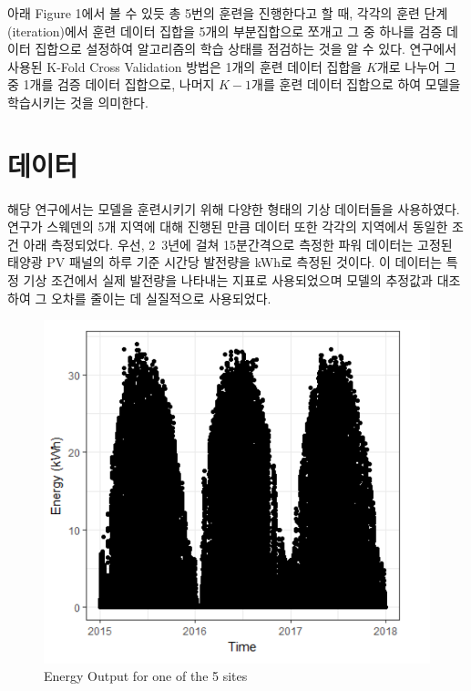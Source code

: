\documentclass{article}
\begin{document}
아래 Figure 1에서 볼 수 있듯 총 5번의 훈련을 진행한다고 할 때, 각각의 훈련 단계(iteration)에서 훈련 데이터 집합을 5개의 부분집합으로 쪼개고 그 중 하나를 검증 데이터 집합으로 설정하여 알고리즘의 학습 상태를 점검하는 것을 알 수 있다. 연구에서 사용된 K-Fold Cross Validation 방법은 1개의 훈련 데이터 집합을 $K$개로 나누어 그 중 1개를 검증 데이터 집합으로, 나머지 $K-1$개를 훈련 데이터 집합으로 하여 모델을 학습시키는 것을 의미한다.

\section{데이터}
해당 연구에서는 모델을 훈련시키기 위해 다양한 형태의 기상 데이터들을 사용하였다. 연구가 스웨덴의 5개 지역에 대해 진행된 만큼 데이터 또한 각각의 지역에서 동일한 조건 아래 측정되었다. 우선, 2~3년에 걸쳐 15분간격으로 측정한 파워 데이터는 고정된 태양광 PV 패널의 하루 기준 시간당 발전량을 kWh로 측정된 것이다. 이 데이터는 특정 기상 조건에서 실제 발전량을 나타내는 지표로 사용되었으며 모델의 추정값과 대조하여 그 오차를 줄이는 데 실질적으로 사용되었다.

\begin{figure}[h]
\centering
\includegraphics[scale=0.20]{./fig/Figure_2.png}
\caption{Energy Output for one of the 5 sites}
\label{fig_2}
\end{figure}
\end{document}
